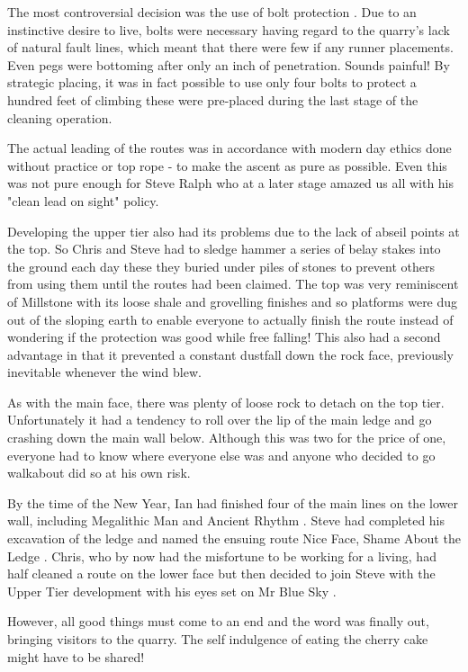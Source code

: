 \documentclass[a5paper,openany,font 10pt]{scrbook}
\begin{document}
The most controversial decision was the use of bolt
protection . Due to an instinctive desire to live, bolts were
necessary having regard to the quarry's lack of natural fault
lines, which meant that there were few  if any runner
placements. Even pegs were bottoming after only an inch of
penetration. Sounds painful! By strategic placing, it was in fact
possible to use only four bolts to protect a hundred feet of
climbing  these were pre-placed during the last stage of the
cleaning operation.

The actual leading of the routes was  in accordance with
modern day ethics  done without practice or top rope - to make
the ascent as pure as possible.  Even this was not pure enough
for Steve Ralph who at a later stage amazed us all with his
"clean lead on sight" policy.

Developing the upper tier also had its problems due to the
lack of abseil points at the top.  So Chris and Steve had to
sledge hammer a series of belay stakes into the ground each day
these they buried under piles of stones to prevent others from
using them until the routes had been claimed. The top was very
reminiscent of Millstone with its loose shale and grovelling
finishes and so platforms were dug out of the sloping earth to
enable everyone to actually finish the route instead of wondering
if the protection was good while free falling! This also had a
second advantage in that it prevented a constant dustfall down
the rock face, previously inevitable whenever the wind blew.

As with the main face, there was plenty of loose rock to
detach on the top tier. Unfortunately it had a tendency to roll
over the lip of the main ledge and go crashing down the main wall
below. Although this was two for the price of one, everyone had
to know where everyone else was and anyone who decided to go
walkabout did so at his own risk.

By the time of the New Year, Ian had finished four of the main
lines on the lower wall, including  Megalithic Man  and  Ancient
Rhythm . Steve had completed his excavation of the ledge and named
the ensuing route  Nice Face, Shame About the Ledge . Chris, who by
now had the misfortune to be working for a living, had half cleaned
a route on the lower face but then decided to join Steve
with the Upper Tier development with his eyes set on Mr Blue
Sky .

However, all good things must come to an end and the word
was finally out, bringing visitors to the quarry. The self indulgence
of eating the cherry cake might have to be shared!
\end{document}
